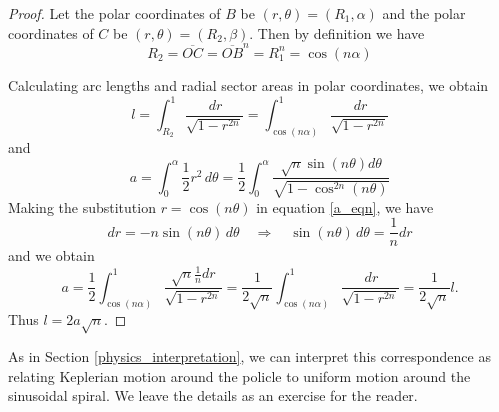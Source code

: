 \documentclass{amsart}
\theoremstyle{definition}
\begin{document}
\begin{proof}
Let the polar coordinates of $B$ be $(r,\theta)=(R_1,\alpha)$ and the polar coordinates of $C$ be 
$(r,\theta)=(R_2,\beta)$. Then by definition we have
\begin{equation}
R_2=\overline{OC}=\overline{OB}^n=R_1^n=\cos(n\alpha)
\end{equation}

Calculating arc lengths and radial sector areas in polar coordinates, we obtain
\begin{equation}
l =\int_{R_2}^1\frac{\,dr}{\sqrt{1-r^{2n}}}=\int_{\cos(n\alpha)}^1\frac{\,dr}{\sqrt{1-r^{2n}}}\label{l_eqn}
\end{equation}
and
\begin{equation}
a=\int_0^{\alpha}\frac{1}{2}r^2\,d\theta=\frac{1}{2}\int_0^{\alpha}\frac{\sqrt{n}\sin(n\theta)d\theta}{\sqrt{1-\cos^{2n}(n\theta)}}\label{a_eqn}
\end{equation}
Making the substitution $r=\cos(n\theta)$ in equation \eqref{a_eqn}, we have
\[dr =-n\sin(n\theta)\,d\theta\quad\Longrightarrow\quad \sin(n\theta)\,d\theta=\frac{1}{n}dr\]
and we obtain
\[a= \frac{1}{2}\int_{\cos(n\alpha)}^1\frac{\sqrt{n}\frac{1}{n}dr}{\sqrt{1-r^{2n}}}=\frac{1}{2\sqrt{n}}\int_{\cos(n\alpha)}^1\frac{\,dr}{\sqrt{1-r^{2n}}}=\frac{1}{2\sqrt{n}}l.\]
Thus $l=2a\sqrt{n}$.
\end{proof}

\bigskip

As in Section \ref{physics_interpretation}, we can interpret this correspondence as relating Keplerian motion around the policle to uniform motion
around the sinusoidal spiral. We leave the details as an exercise for the reader.

\vspace{35pt}
\end{document}
